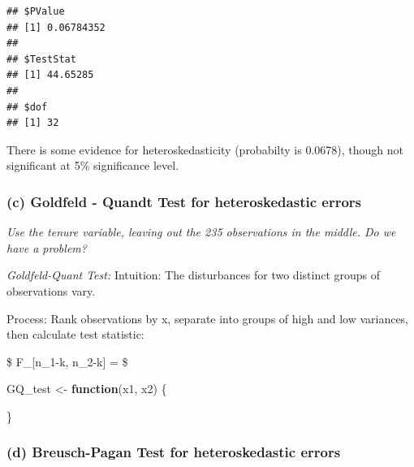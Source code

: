 \documentclass[11pt,]{article}
\newenvironment{Shaded}{\begin{snugshade}}{\end{snugshade}}
\newcommand{\KeywordTok}[1]{\textcolor[rgb]{0.13,0.29,0.53}{\textbf{#1}}}
\newcommand{\DecValTok}[1]{\textcolor[rgb]{0.00,0.00,0.81}{#1}}
\newcommand{\StringTok}[1]{\textcolor[rgb]{0.31,0.60,0.02}{#1}}
\newcommand{\CommentTok}[1]{\textcolor[rgb]{0.56,0.35,0.01}{\textit{#1}}}
\newcommand{\ControlFlowTok}[1]{\textcolor[rgb]{0.13,0.29,0.53}{\textbf{#1}}}
\newcommand{\OperatorTok}[1]{\textcolor[rgb]{0.81,0.36,0.00}{\textbf{#1}}}
\newcommand{\NormalTok}[1]{#1}
\begin{document}
\begin{Shaded}
\end{Shaded}

\begin{verbatim}
## $PValue
## [1] 0.06784352
## 
## $TestStat
## [1] 44.65285
## 
## $dof
## [1] 32
\end{verbatim}

There is some evidence for heteroskedasticity (probabilty is 0.0678),
though not significant at 5\% significance level.

\subsubsection{(c) Goldfeld - Quandt Test for heteroskedastic
errors}\label{c-goldfeld---quandt-test-for-heteroskedastic-errors}

\emph{Use the tenure variable, leaving out the 235 observations in the
middle. Do we have a problem?}

\emph{Goldfeld-Quant Test:} Intuition: The disturbances for two distinct
groups of observations vary.

Process: Rank observations by x, separate into groups of high and low
variances, then calculate test statistic:

\$ F\_{[}n\_1-k, n\_2-k{]} =  \$

\begin{Shaded}
\begin{Highlighting}[]
\NormalTok{GQ_test <-}\StringTok{ }\ControlFlowTok{function}\NormalTok{(x1, x2) \{}
  
  
  
\NormalTok{\}}
\end{Highlighting}
\end{Shaded}

\subsubsection{(d) Breusch-Pagan Test for heteroskedastic
errors}\label{d-breusch-pagan-test-for-heteroskedastic-errors}
\end{document}
